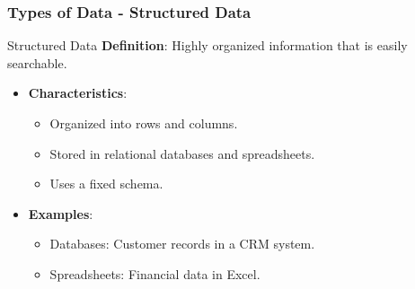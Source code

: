 \documentclass{beamer}
\begin{document}
\begin{frame}[fragile]
    \frametitle{Types of Data - Structured Data}
    \begin{block}{Structured Data}
        \textbf{Definition}: Highly organized information that is easily searchable.
    \end{block}
    \begin{itemize}
        \item \textbf{Characteristics}:
        \begin{itemize}
            \item Organized into rows and columns.
            \item Stored in relational databases and spreadsheets.
            \item Uses a fixed schema.
        \end{itemize}
        \item \textbf{Examples}:
        \begin{itemize}
            \item Databases: Customer records in a CRM system.
            \item Spreadsheets: Financial data in Excel.
        \end{itemize}
    \end{itemize}
\end{frame}
\end{document}
